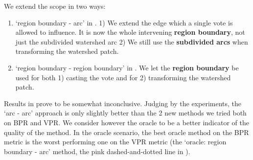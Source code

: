 %
% 
% 
% 


We extend the scope in two ways:
\begin{enumerate}
 \item{`region boundary - arc'} in . 
 1) We extend the 
 edge which a single vote is allowed to influence. It is now the whole intervening {\bf region boundary}, not just the subdivided watershed arc 
 2) We 
 still use the {\bf subdivided arcs} when transforming the watershed patch. 
 \item{`region boundary - region boundary'} in . We let the {\bf region boundary} be used for both 1) casting the vote and for 2) transforming the watershed patch.
\end{enumerate}


Results in  prove to be somewhat inconclusive. %
Judging by the experiments, the `arc - arc' approach is only slightly %
better than the 2 new methods we tried both on BPR and VPR. We consider however the oracle to be a better indicator of the quality of the method. In the oracle scenario, the best oracle method on the BPR metric is the worst performing one on the VPR metric (the `oracle: region boundary - arc' method, the pink dashed-and-dotted line in %
).

